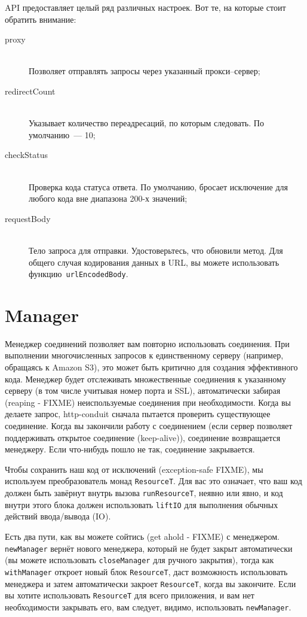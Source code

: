 API предоставляет целый ряд различных настроек. Вот те, на которые стоит
обратить внимание:
\begin{description}
\item[proxy] \hfill \\
  Позволяет отправлять запросы через указанный прокси--сервер;
\item[redirectCount] \hfill \\
  Указывает количество переадресаций, по которым следовать. По
  умолчанию~--- 10;
\item[checkStatus] \hfill \\
  Проверка кода статуса ответа. По умолчанию, бросает исключение
  для любого кода вне диапазона 200-х значений;
\item[requestBody] \hfill \\
  Тело запроса для отправки. Удостоверьтесь, что обновили метод. Для
  общего случая кодирования данных в URL, вы можете использовать
  функцию~\lstinline!urlEncodedBody!.
\end{description}

\section{Manager}
Менеджер соединений позволяет вам повторно использовать
соединения. При выполнении многочисленных запросов к единственному
серверу (например, обращаясь к Amazon S3), это может быть критично для
создания эффективного кода. Менеджер будет отслеживать множественные
соединения к указанному серверу (в том числе учитывая номер порта и
SSL), автоматически забирая (reaping - FIXME) неиспользуемые
соединения при необходимости. Когда вы делаете запрос, http-conduit
сначала пытается проверить существующее соединение. Когда вы закончили
работу с соединением (если сервер позволяет поддерживать открытое
соединение (keep-alive)), соединение возвращается менеджеру. Если
что-нибудь пошло не так, соединение закрывается.

Чтобы сохранить наш код от исключений (exception-safe FIXME), мы
используем преобразователь монад \lstinline!ResourceT!. Для вас это
означает, что ваш код должен быть завёрнут внутрь вызова
\lstinline!runResourceT!, неявно или явно, и код внутри этого блока
должен использовать \lstinline!liftIO! для выполнения обычных действий
ввода/вывода (IO).

Есть два пути, как вы можете сойтись (get ahold - FIXME) с
менеджером. \lstinline!newManager! вернёт нового менеджера, который не
будет закрыт автоматически (вы можете использовать
\lstinline!closeManager! для ручного закрытия), тогда как
\lstinline!withManager! откроет новый блок \lstinline!ResourceT!, даст
возможность использовать менеджера и затем автоматически закроет
\lstinline!ResourceT!, когда вы закончите. Если вы хотите использовать
\lstinline!ResourceT! для всего приложения, и вам нет необходимости
закрывать его, вам следует, видимо, использовать \lstinline!newManager!.


